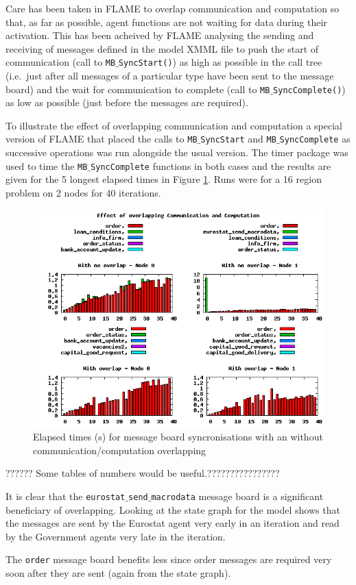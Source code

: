 Care has been taken in FLAME to overlap communication and computation so that, as far as possible, agent functions are not waiting for data during their activation. This has been acheived by FLAME analysing the sending and receiving of messages defined in the model XMML file to push the start of communication (call to \texttt{MB$\_$SyncStart()}) as high as possible in the call tree (i.e.\ just after all messages of a particular type have been sent to the message board) and the wait for communication to complete (call to \texttt{MB$\_$SyncComplete()}) as low as possible (just before the messages are required).

To illustrate the effect of overlapping communication and computation a special version of FLAME that placed the calls to  \texttt{MB$\_$SyncStart} and \texttt{MB$\_$SyncComplete} as successive operations was run alongside the usual version. The timer package was used to time the \texttt{MB$\_$SyncComplete} functions in both cases and the results are given for the 5 longest elapsed times in Figure \ref{fig:overlap}. Runs were for a 16 region problem on 2 nodes for 40 iterations. 

\begin{figure}[ht]
 \centering
  \includegraphics[width=450pt]{overlap.png}
 \caption{Elapsed times (s) for message board syncronisations with an without communication/computation overlapping}
 \label{fig:overlap}
\end{figure}

?????? Some tables of numbers would be useful.????????????????

It is clear that the \texttt{eurostat$\_$send$\_$macrodata} message board is a significant beneficiary of overlapping. Looking at the state graph for the model shows that the messages are sent by the Eurostat agent very early in an iteration and read by the Government agents very late in the iteration.

The \texttt{order} message board benefits less since order messages are required very soon after they are sent (again from the state graph).






 
